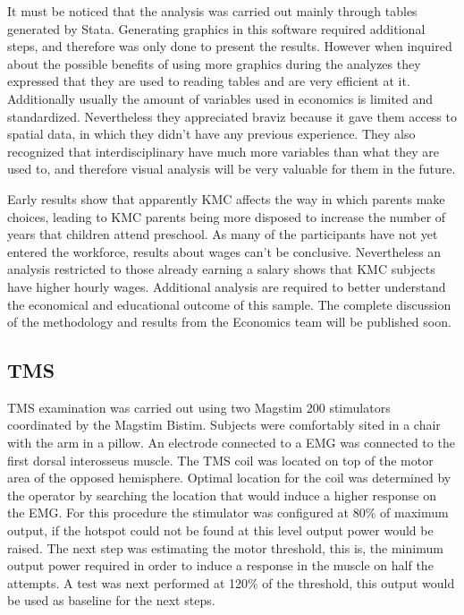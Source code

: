 It must be noticed that the analysis was carried out mainly through tables generated by Stata. Generating graphics in this software required additional steps, and therefore was only done to present the results. However when inquired about the possible benefits of using more graphics during the analyzes they expressed that they are used to reading tables and are very efficient at it. Additionally usually the amount of variables used in economics is limited and standardized. Nevertheless they appreciated braviz because it gave them access to spatial data, in which they didn't have any previous experience. They also recognized that interdisciplinary have much more variables than what they are used to, and therefore visual analysis will be very valuable for them in the future.

Early results show that apparently KMC affects the way in which parents make choices, leading to KMC parents being more disposed to increase the number of years that children attend preschool. As many of the participants have not yet entered the workforce, results about wages can't be conclusive. Nevertheless an analysis restricted to those already earning a salary shows that KMC subjects have higher hourly wages. Additional analysis are required to better understand the economical and educational outcome of this sample.  The complete discussion of the methodology and results from the Economics team will be published soon.
\subsection{TMS}

TMS examination was carried out using two Magstim 200 stimulators coordinated by the Magstim Bistim. Subjects were comfortably sited in a chair with the arm in a pillow. An electrode connected to a EMG was connected to the first dorsal interosseus muscle. The TMS coil was located on top of the motor area of the opposed hemisphere. Optimal location for the coil was determined by the operator by searching the location that would induce a higher response on the EMG. For this procedure the stimulator was configured at 80\% of maximum output, if the hotspot could not be found at this level output power would be raised. The next step was estimating the motor threshold, this is, the minimum output power required in order to induce a response in the muscle on half the attempts. A test was next performed at 120\% of the threshold, this output would be used as baseline for the next steps.

